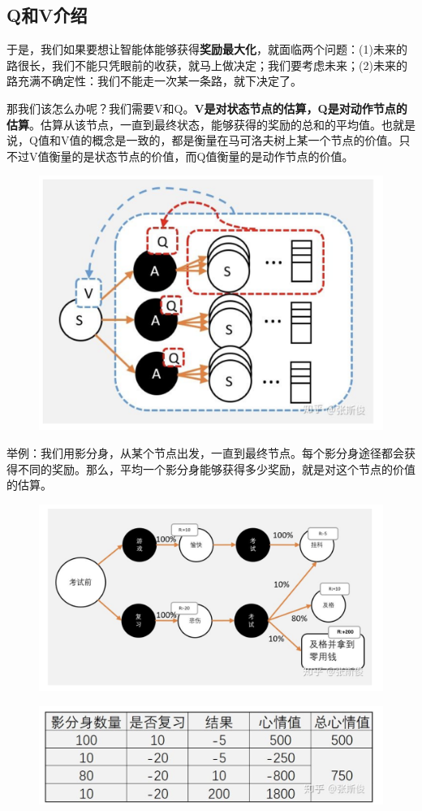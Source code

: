 \documentclass[12pt]{article}
\begin{document}
\subsection{Q和V介绍}
于是，我们如果要想让智能体能够获得\textbf{奖励最大化}，就面临两个问题：(1)未来的路很长，我们不能只凭眼前的收获，就马上做决定；我们要考虑未来；(2)未来的路充满不确定性：我们不能走一次某一条路，就下决定了。

那我们该怎么办呢？我们需要V和Q。\textbf{V是对状态节点的估算，Q是对动作节点的估算}。估算从该节点，一直到最终状态，能够获得的奖励的总和的平均值。也就是说，Q值和V值的概念是一致的，都是衡量在马可洛夫树上某一个节点的价值。只不过V值衡量的是状态节点的价值，而Q值衡量的是动作节点的价值。
\begin{figure}[H]
    \centering
    \includegraphics[width=.5\textwidth]{fig/ReinforcementLearning/RL_V_Q_Estimation.png}
\end{figure}

\begin{framed}
\small{
举例：我们用影分身，从某个节点出发，一直到最终节点。每个影分身途径都会获得不同的奖励。那么，平均一个影分身能够获得多少奖励，就是对这个节点的价值的估算。

\begin{figure}[H]
    \centering
    \includegraphics[width=.6\textwidth]{fig/ReinforcementLearning/RL_V_Q_R_Example_1.png}
\end{figure}
\begin{figure}[H]
    \centering
    \includegraphics[width=.6\textwidth]{fig/ReinforcementLearning/RL_V_Q_R_Example_2.png}
\end{figure}
}
\end{framed}
\end{document}
